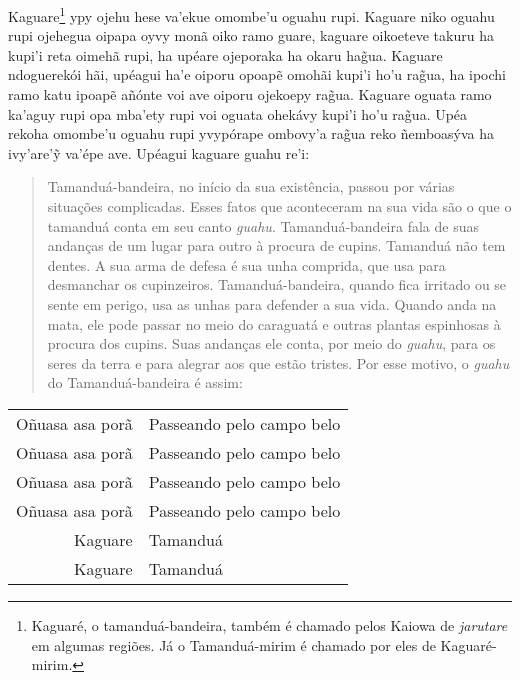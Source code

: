 Kaguare\footnote{Kaguaré, o tamanduá-bandeira, também é chamado pelos
  Kaiowa de \emph{jarutare} em algumas regiões. Já o Tamanduá-mirim é
  chamado por eles de Kaguaré-mirim.} ypy ojehu hese va'ekue omombe'u
oguahu rupi. Kaguare niko oguahu rupi ojehegua oipapa oyvy monã oiko
ramo guare, kaguare oikoeteve takuru ha kupi'i reta oimehã rupi, ha
upéare ojeporaka ha okaru hag̃ua. Kaguare ndoguerekói hãi, upéagui ha'e
oiporu opoapẽ omohãi kupi'i ho'u rag̃ua, ha ipochi ramo katu ipoapẽ
añónte voi ave oiporu ojekoepy rag̃ua. Kaguare oguata ramo ka'aguy rupi
opa mba'ety rupi voi oguata ohekávy kupi'i ho'u rag̃ua. Upéa rekoha
omombe'u oguahu rupi yvypórape ombovy'a rag̃ua reko ñemboasýva ha
ivy'are'ỹ va'épe ave. Upéagui kaguare guahu re'i:

\begin{quote}
Tamanduá-bandeira, no início da sua existência, passou por várias
situações complicadas. Esses fatos que aconteceram na sua vida são o que
o tamanduá conta em seu canto \emph{guahu}. Tamanduá-bandeira fala de
suas andanças de um lugar para outro à procura de cupins. Tamanduá não
tem dentes. A sua arma de defesa é sua unha comprida, que usa para
desmanchar os cupinzeiros. Tamanduá-bandeira, quando fica irritado ou se
sente em perigo, usa as unhas para defender a sua vida. Quando anda na
mata, ele pode passar no meio do caraguatá e outras plantas espinhosas à
procura dos cupins. Suas andanças ele conta, por meio do \emph{guahu},
para os seres da terra e para alegrar aos que estão tristes. Por esse
motivo, o \emph{guahu} do Tamanduá-bandeira é assim:
\end{quote}

\begin{table}[]
\begin{tabular}{rl}
Oñuasa\footnotemark{} asa porã          & Passeando pelo campo belo           \\
Oñuasa asa porã          & Passeando pelo campo belo           \\
Oñuasa asa porã  		& Passeando pelo campo belo \\
Oñuasa asa porã          & Passeando pelo campo belo           \\
Kaguare          & Tamanduá           \\
Kaguare          & Tamanduá           \\                  
\end{tabular}
\end{table}



